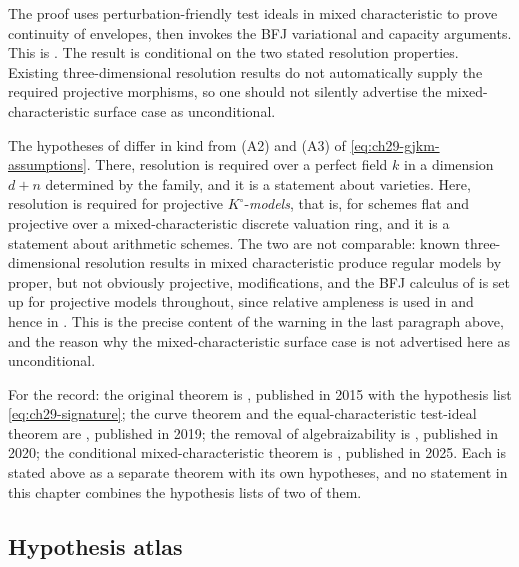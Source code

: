 The proof uses perturbation-friendly test ideals in mixed characteristic to
prove continuity of envelopes, then invokes the BFJ variational and capacity
arguments.  This is \cite[Theorems~7.1 and~8.1]{FGK25}.  The result is
conditional on the two stated resolution properties.  Existing
three-dimensional resolution results do not automatically supply the
required projective morphisms, so one should not silently advertise the
mixed-characteristic surface case as unconditional.

\begin{remark}
\label{rem:ch29-fgk-resolution}
The hypotheses of  differ in kind
from \textup{(A2)} and \textup{(A3)} of
\eqref{eq:ch29-gjkm-assumptions}.  There, resolution is required over a
perfect field \(k\) in a dimension \(d+n\) determined by the family, and it
is a statement about varieties.  Here, resolution is required for
projective \(K^\circ\)-\emph{models}, that is, for schemes flat and
projective over a mixed-characteristic discrete valuation ring, and it is a
statement about arithmetic schemes.  The two are not comparable: known
three-dimensional resolution results in mixed characteristic produce
regular models by proper, but not obviously projective, modifications, and
the BFJ calculus of  is set up for projective
models throughout, since relative ampleness is used in
 and hence in
.  This is the precise content of
the warning in the last paragraph above, and the reason why the
mixed-characteristic surface case is not advertised here as unconditional.
\end{remark}

\begin{remark}
\label{rem:ch29-dates}
For the record: the original theorem is \cite{BFJ15}, published in 2015
with the hypothesis list \eqref{eq:ch29-signature}; the curve theorem and
the equal-characteristic test-ideal theorem are \cite{GJKM19}, published in
2019; the removal of algebraizability is \cite{BGGJKM20}, published in
2020; the conditional mixed-characteristic theorem is \cite{FGK25},
published in 2025.  Each is stated above as a separate theorem with its own
hypotheses, and no statement in this chapter combines the hypothesis lists
of two of them.
\end{remark}

\subsection{Hypothesis atlas}
\label{sec:ch29-atlas}

